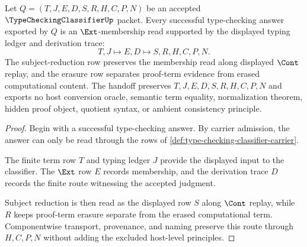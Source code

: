 \begin{theorem}
\label{thm:type-checking-classifier-membership-soundness}
Let $Q=(T,J,E,D,S,R,H,C,P,N)$ be an accepted $\TypeCheckingClassifierUp$ packet. Every successful type-checking answer exported by $Q$ is an $\Ext$-membership read supported by the displayed typing ledger and derivation trace:
$$
T,J \longmapsto E,D \longmapsto S,R,H,C,P,N .
$$
The subject-reduction row preserves the membership read along displayed $\Cont$ replay, and the erasure row separates proof-term evidence from erased computational content. The handoff preserves $T,J,E,D,S,R,H,C,P,N$ and exports no host conversion oracle, semantic term equality, normalization theorem, hidden proof object, quotient syntax, or ambient consistency principle.
\end{theorem}
\begin{proof}
Begin with a successful type-checking answer. By carrier admission, the answer can only be read through the rows of \autoref{def:type-checking-classifier-carrier}.

The finite term row $T$ and typing ledger $J$ provide the displayed input to the classifier. The $\Ext$ row $E$ records membership, and the derivation trace $D$ records the finite route witnessing the accepted judgment.

Subject reduction is then read as the displayed row $S$ along $\Cont$ replay, while $R$ keeps proof-term erasure separate from the erased computational term. Componentwise transport, provenance, and naming preserve this route through $H,C,P,N$ without adding the excluded host-level principles.
\end{proof}


\begin{closurestatus}{\TypeCheckingClassifierUp}
  \theoryclosure{\seedClosure}
  \formalstatus{\unformalizedV}
\end{closurestatus}
